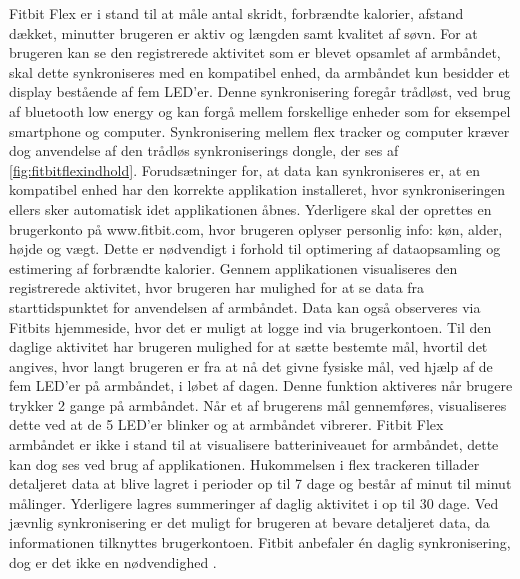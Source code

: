 Fitbit Flex er i stand til at måle antal skridt, forbrændte kalorier, afstand dækket, minutter brugeren er aktiv og længden samt kvalitet af søvn. 
For at brugeren kan se den registrerede aktivitet som er blevet opsamlet af armbåndet, skal dette synkroniseres med en kompatibel enhed, da armbåndet kun besidder et display bestående af fem LED'er. %
Denne synkronisering foregår trådløst, ved brug af bluetooth low energy og kan forgå mellem forskellige enheder som for eksempel smartphone og computer. 
Synkronisering mellem flex tracker og computer kræver dog anvendelse af den trådløs synkroniserings dongle, der ses af \autoref{fig:fitbitflexindhold}.
Forudsætninger for, at data kan synkroniseres er, at en kompatibel enhed har den korrekte applikation installeret, hvor synkroniseringen ellers sker automatisk idet applikationen åbnes.  
Yderligere skal der oprettes en brugerkonto på www.fitbit.com, hvor brugeren oplyser personlig info: køn, alder, højde og vægt. Dette er nødvendigt i forhold til optimering af dataopsamling og estimering af forbrændte kalorier.  
Gennem applikationen visualiseres den registrerede aktivitet, hvor brugeren har mulighed for at se data fra starttidspunktet for anvendelsen af armbåndet. Data kan også observeres via  Fitbits hjemmeside, hvor det er muligt at logge ind via brugerkontoen. 
Til den daglige aktivitet har brugeren mulighed for at sætte bestemte mål, hvortil det angives, hvor langt brugeren er fra at nå det givne fysiske mål, ved hjælp af de fem LED'er på armbåndet, i løbet af dagen. Denne funktion aktiveres når brugere trykker 2 gange på armbåndet. 
Når et af brugerens mål gennemføres, visualiseres dette ved at de 5 LED'er blinker og at armbåndet vibrerer. 
Fitbit Flex armbåndet er ikke i stand til at visualisere batteriniveauet for armbåndet, dette kan dog ses ved brug af applikationen. 
Hukommelsen i flex trackeren tillader detaljeret data at blive lagret i perioder op til 7 dage og består af minut til minut målinger.  
Yderligere lagres summeringer af daglig aktivitet i op til 30 dage. 
Ved jævnlig synkronisering er det muligt for brugeren at bevare detaljeret data, da informationen tilknyttes brugerkontoen. 
Fitbit anbefaler én daglig synkronisering, dog er det ikke en nødvendighed \citep{fitbitflex}. 

